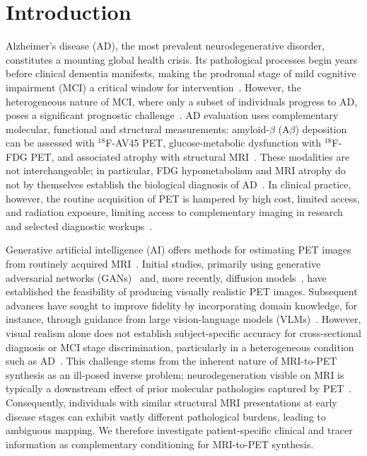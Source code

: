 \documentclass{article}
\begin{document}
\section{Introduction}
Alzheimer's disease (AD), the most prevalent neurodegenerative disorder, constitutes a mounting global health crisis. Its pathological processes begin years before clinical dementia manifests, making the prodromal stage of mild cognitive impairment (MCI) a critical window for intervention~\cite{scheltens2021alzheimer}. However, the heterogeneous nature of MCI, where only a subset of individuals progress to AD, poses a significant prognostic challenge~\cite{haller2023neuroimaging}. AD evaluation uses complementary molecular, functional and structural measurements: amyloid-$\beta$ (A$\beta$) deposition can be assessed with $^{18}$F-AV45 PET, glucose-metabolic dysfunction with $^{18}$F-FDG PET, and associated atrophy with structural MRI~\cite{ossenkoppele2022amyloid,yan2021sex,haller2023neuroimaging}. These modalities are not interchangeable; in particular, FDG hypometabolism and MRI atrophy do not by themselves establish the biological diagnosis of AD~\cite{jack2024revised}. In clinical practice, however, the routine acquisition of PET is hampered by high cost, limited access, and radiation exposure, limiting access to complementary imaging in research and selected diagnostic workups~\cite{nordberg2010use}.

Generative artificial intelligence (AI) offers methods for estimating PET images from routinely acquired MRI~\cite{dayarathna2024deep,lee2024synthesizing}. Initial studies, primarily using generative adversarial networks (GANs)~\cite{pan2018synthesizing,pan2020spatially,apostolopoulos2022applications} and, more recently, diffusion models~\cite{xie2024synthesizing,chen2025multi,theodorou2025mri2pet}, have established the feasibility of producing visually realistic PET images. Subsequent advances have sought to improve fidelity by incorporating domain knowledge, for instance, through guidance from large vision-language models (VLMs)~\cite{wang2025unisyn,liu2025direct}.  However, visual realism alone does not establish subject-specific accuracy for cross-sectional diagnosis or MCI stage discrimination, particularly in a heterogeneous condition such as AD~\cite{ossenkoppele2022amyloid}. This challenge stems from the inherent nature of MRI-to-PET synthesis as an ill-posed inverse problem; neurodegeneration visible on MRI is typically a downstream effect of prior molecular pathologies captured by PET~\cite{jagust2018imaging}. Consequently, individuals with similar structural MRI presentations at early disease stages can exhibit vastly different pathological burdens, leading to ambiguous mapping. We therefore investigate patient-specific clinical and tracer information as complementary conditioning for MRI-to-PET synthesis.
\end{document}

